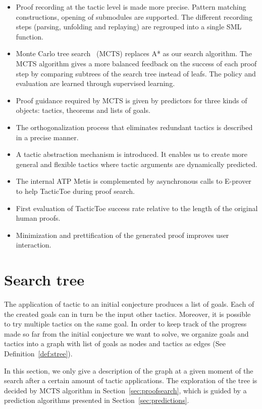 \documentclass[runningheads,a4paper,draft]{svjour3}
\def\eprover{\textsf{E-prover}\xspace}
\def\sml{\textsf{SML}\xspace}
\def\metis{\textsf{Metis}\xspace}
\def\tactictoe{\textsf{TacticToe}\xspace}
\begin{document}
\begin{itemize}
\item Proof recording at the tactic level is made more precise. Pattern
matching constructions, opening of submodules are supported. The different
recording steps (parsing, unfolding and replaying) are regrouped into a single
\sml function.
\item Monte Carlo tree search~\cite{montecarlo} (MCTS) replaces A* as our
search algorithm. The MCTS algorithm gives a more balanced feedback on
the success of
each proof step by
comparing subtrees of the search tree instead of leafs. The policy and
evaluation are learned
through supervised learning.
\item Proof guidance required by MCTS is given by predictors for
three kinds of objects: tactics, theorems and lists of goals.
\item The orthogonalization process that eliminates redundant tactics is 
described in a precise manner.
\item A tactic abstraction mechanism is introduced. It enables us to create
more general and flexible tactics where tactic arguments are dynamically
predicted.
\item The internal ATP \metis is complemented
by asynchronous calls to \eprover to help \tactictoe during proof search.
\item First evaluation of \tactictoe success rate relative to
the length of the original human proofs.
\item Minimization and prettification of the generated proof improves user 
interaction.
\end{itemize}


\section{Search tree}\label{sec:prelim}

The application of tactic to an initial conjecture produces a list of goals. 
Each of the created goals can in turn be the input other tactics. Moreover, it 
is possible to try multiple tactics on the same goal. In order to keep track of 
the progress made so far from the initial conjecture we want to solve, we 
organize goals and tactics into a graph with list of goals as nodes and tactics 
as edges (See Definition~\ref{def:stree}).

In this section, we only give a description of the graph at a given 
moment of the search after a certain amount of tactic applications. 
The exploration of the tree is decided by MCTS algorithm in 
Section~\ref{sec:proofsearch}, which is guided by a prediction algorithms 
presented in Section~\ref{sec:predictions}.
\end{document}
